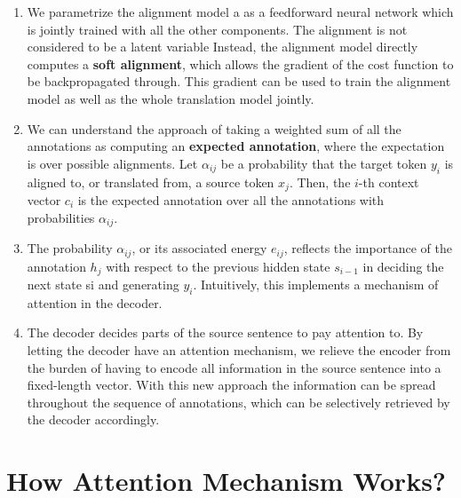 \begin{enumerate}
    \item We parametrize the alignment model a as a feedforward neural network which is jointly trained with all the other components.
    The alignment is not considered to be a latent variable
    Instead, the alignment model directly computes a \textbf{soft alignment}, which allows the gradient of the cost function to be backpropagated through.
    This gradient can be used to train the alignment model as well as the whole translation model jointly.
    \hfill \cite{arxiv/1409.0473/NMT-Jointly-Learning-Align-Translate}

    \item We can understand the approach of taking a weighted sum of all the annotations as computing an \textbf{expected annotation}, where the expectation is over possible alignments. 
    Let $\alpha_{ij}$ be a probability that the target token $y_i$ is aligned to, or translated from, a source token $x_j $. 
    Then, the $i$-th context vector $c_i$ is the expected annotation over all the annotations with probabilities $\alpha_{ij} $.
    \hfill \cite{arxiv/1409.0473/NMT-Jointly-Learning-Align-Translate}

    \item The probability $\alpha_{ij} $, or its associated energy $e_{ij }$, reflects the importance of the annotation $h_j$ with respect to the previous hidden state $s_{i-1}$ in deciding the next state si and generating $y_i$. 
    Intuitively, this implements a mechanism of attention in the decoder.
    \hfill \cite{arxiv/1409.0473/NMT-Jointly-Learning-Align-Translate}
    
    \item The decoder decides parts of the source sentence to pay attention to. 
    By letting the decoder have an attention mechanism, we relieve the encoder from the burden of having to encode all information in the source sentence into a fixed-length vector. 
    With this new approach the information can be spread throughout the sequence of annotations, which can be selectively retrieved by the decoder accordingly.
    \hfill \cite{arxiv/1409.0473/NMT-Jointly-Learning-Align-Translate}
\end{enumerate}














\section{How Attention Mechanism Works?}


